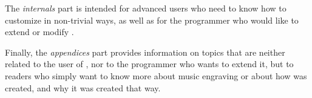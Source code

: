 The \emph{internals} part is intended for advanced users who need to
know how to customize \sysname{} in non-trivial ways, as well as for the
programmer who would like to extend or modify \sysname{}.

Finally, the \emph{appendices} part provides information on topics
that are neither related to the user of \sysname{}, nor to the programmer
who wants to extend it, but to readers who simply want to know more
about music engraving or about how \sysname{} was created, and why it was
created that way. 


